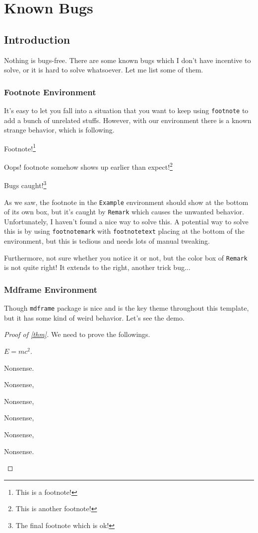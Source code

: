 \chapter{Known Bugs}

\section{Introduction}
Nothing is bugs-free. There are some known bugs which I don't have incentive to solve, or it is hard to solve whatsoever. Let me list some of them.

\subsection{Footnote Environment}
It's easy to let you fall into a situation that you want to keep using \texttt{footnote} to add a bunch of unrelated stuffs. However, with our environment there is a known strange behavior, which is following.
\begin{eg}
	Footnote!\footnote{This is a footnote!}
	\begin{remark}
		Oops! footnote somehow shows up earlier than expect!\footnote{This is another footnote!}
	\end{remark}

	Bugs caught!\footnote{The final footnote which is ok!}
\end{eg}

As we saw, the footnote in the \texttt{Example} environment should show at the bottom of its own box, but it's caught by \texttt{Remark} which causes the unwanted behavior. Unfortunately, I haven't found a nice way to solve this. A potential way to solve this is by using \texttt{footnotemark} with \texttt{footnotetext} placing at the bottom of the environment, but this is tedious and needs lots of manual tweaking.

Furthermore, not sure whether you notice it or not, but the color box of \texttt{Remark} is not quite right! It extends to the right, another trick bug...

\subsection{Mdframe Environment}
Though \texttt{mdframe} package is nice and is the key theme throughout this template, but it has some kind of weird behavior. Let's see the demo.
\begin{proof}[Proof of \autoref{thm}]
	We need to prove the followings.
	\begin{claim}
		\(E = mc^{2} \).
	\end{claim}
	\begin{explanation}

		Nonsense.

		Nonsense,

		Nonsense,

		Nonsense,

		Nonsense,

		Nonsense.
	\end{explanation}

\end{proof}

